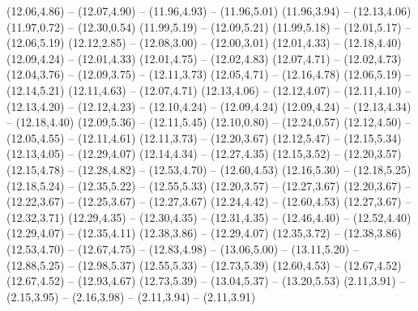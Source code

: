 {  (12.06,4.86) -- (12.07,4.90) -- (11.96,4.93) -- (11.96,5.01)
  (11.96,3.94) -- (12.13,4.06)
  (11.97,0.72) -- (12.30,0.54)
  (11.99,5.19) -- (12.09,5.21)
  (11.99,5.18) -- (12.01,5.17) -- (12.06,5.19)
  (12.12,2.85) -- (12.08,3.00) -- (12.00,3.01)
  (12.01,4.33) -- (12.18,4.40)
  (12.09,4.24) -- (12.01,4.33)
  (12.01,4.75) -- (12.02,4.83)
  (12.07,4.71) -- (12.02,4.73)
  (12.04,3.76) -- (12.09,3.75) -- (12.11,3.73)
  (12.05,4.71) -- (12.16,4.78)
  (12.06,5.19) -- (12.14,5.21)
  (12.11,4.63) -- (12.07,4.71)
  (12.13,4.06) -- (12.12,4.07) -- (12.11,4.10) -- (12.13,4.20) -- (12.12,4.23) -- (12.10,4.24) -- (12.09,4.24)
  (12.09,4.24) -- (12.13,4.34) -- (12.18,4.40)
  (12.09,5.36) -- (12.11,5.45)
  (12.10,0.80) -- (12.24,0.57)
  (12.12,4.50) -- (12.05,4.55) -- (12.11,4.61)
  (12.11,3.73) -- (12.20,3.67)
  (12.12,5.47) -- (12.15,5.34)
  (12.13,4.05) -- (12.29,4.07)
  (12.14,4.34) -- (12.27,4.35)
  (12.15,3.52) -- (12.20,3.57)
  (12.15,4.78) -- (12.28,4.82) -- (12.53,4.70) -- (12.60,4.53)
  (12.16,5.30) -- (12.18,5.25)
  (12.18,5.24) -- (12.35,5.22) -- (12.55,5.33)
  (12.20,3.57) -- (12.27,3.67)
  (12.20,3.67) -- (12.22,3.67) -- (12.25,3.67) -- (12.27,3.67)
  (12.24,4.42) -- (12.60,4.53)
  (12.27,3.67) -- (12.32,3.71)
  (12.29,4.35) -- (12.30,4.35) -- (12.31,4.35) -- (12.46,4.40) -- (12.52,4.40)
  (12.29,4.07) -- (12.35,4.11)
  (12.38,3.86) -- (12.29,4.07)
  (12.35,3.72) -- (12.38,3.86)
  (12.53,4.70) -- (12.67,4.75) -- (12.83,4.98) -- (13.06,5.00) -- (13.11,5.20) -- (12.88,5.25) -- (12.98,5.37)
  (12.55,5.33) -- (12.73,5.39)
  (12.60,4.53) -- (12.67,4.52)
  (12.67,4.52) -- (12.93,4.67)
  (12.73,5.39) -- (13.04,5.37) -- (13.20,5.53)
  (2.11,3.91) -- (2.15,3.95) -- (2.16,3.98) -- (2.11,3.94) -- (2.11,3.91)}
